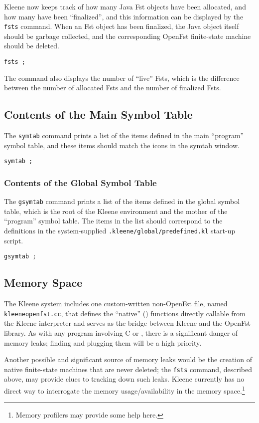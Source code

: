 Kleene now keeps track of how many Java Fst objects have been allocated,
and how many have been ``finalized'', and this information can be
displayed by the \texttt{fsts} command.  When an Fst object has been
finalized, the Java object itself should be garbage collected, and the
corresponding OpenFst finite-state machine should be deleted.

\begin{Verbatim}
fsts ;
\end{Verbatim}

\noindent
The command also displays the number of ``live'' Fsts, which is the
difference between the number of allocated Fsts and the number of finalized Fsts.

\subsection{Contents of the Main Symbol Table}

The \texttt{symtab} command prints a list of the items defined in the main
``program'' symbol table, and these items should match the icons in the  symtab
window.

\begin{Verbatim}
symtab ;
\end{Verbatim}

\subsubsection{Contents of the Global Symbol Table}

The \texttt{gsymtab} command prints a list of the items defined in the global symbol
table, which is the root of the Kleene environment and the mother of the
``program'' symbol table.  The items in the list should correspond to the definitions
in the system-supplied \texttt{.kleene/global/predefined.kl} start-up script.

\begin{Verbatim}
gsymtab ;
\end{Verbatim}

\subsection{\protect\CPP{} Memory Space}

The Kleene system includes one custom-written non-OpenFst \CPP{} file,
named \texttt{kleeneopenfst.cc}, that defines the ``native'' (\CPP{})
functions directly callable from the Kleene interpreter and serves as the
 bridge between Kleene and the OpenFst library.  As with any
program involving C or \CPP{}, there is a significant danger of memory
leaks; finding and plugging them will be a high priority.

Another possible and significant source of \CPP{} memory leaks would be
the creation of native finite-state machines that are never deleted; the
\texttt{fsts} command, described above, may provide clues to tracking
down such leaks.  Kleene currently has no direct way to interrogate the
memory usage/availability in the \CPP{} memory space.\footnote{Memory
profilers may provide some help here.}


